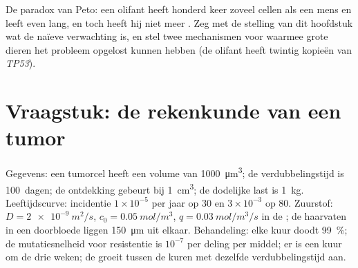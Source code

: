 \begin{exercise}[$\star\star\star$]\label{exo:b3:cancer-biology:12}
De paradox van Peto: een olifant heeft honderd keer zoveel cellen als
een mens en leeft even lang, en toch heeft hij niet meer . Zeg
met de stelling van dit hoofdstuk wat de naïeve verwachting is, en stel
twee mechanismen voor waarmee grote dieren het probleem opgelost kunnen
hebben (de olifant heeft twintig kopieën van \emph{TP53}).
\end{exercise}

\section{Vraagstuk: de rekenkunde van een tumor}

\begin{problem}
\label{pb:b3:cancer-biology:1}
Gegevens: een tumorcel heeft een volume van \qty{1000}{\micro m^3}; de
verdubbelingstijd is \qty{100}{dagen}; de ontdekking gebeurt bij
\qty{1}{cm^3}; de dodelijke last is \qty{1}{kg}. Leeftijdscurve:
incidentie $1\times 10^{-5}$ per jaar op $30$ en $3\times
10^{-3}$ op $80$. Zuurstof: $D = \qty{2e-9}{m^2/s}$, $c_{0} =
\qty{0.05}{mol/m^3}$, $q = \qty{0.03}{mol/m^3/s}$ in de ; de
haarvaten in een doorbloede  liggen \qty{150}{\micro m} uit
elkaar. Behandeling: elke kuur doodt \qty{99}{\%}; de mutatiesnelheid
voor resistentie is $10^{-7}$ per deling per middel; er is een kuur om
de drie weken; de  groeit tussen de kuren met dezelfde
verdubbelingstijd aan.


\end{problem}
